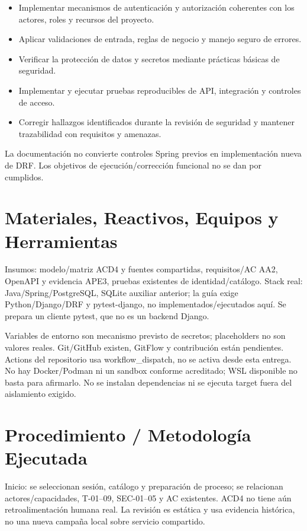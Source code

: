 \documentclass[11pt,a4paper]{article}
\providecommand{\tightlist}{\setlength{\itemsep}{0pt}\setlength{\parskip}{0pt}}
\begin{document}
\begin{itemize}
\tightlist
\item
  Implementar mecanismos de autenticación y autorización coherentes con
  los actores, roles y recursos del proyecto.
\item
  Aplicar validaciones de entrada, reglas de negocio y manejo seguro de
  errores.
\item
  Verificar la protección de datos y secretos mediante prácticas básicas
  de seguridad.
\item
  Implementar y ejecutar pruebas reproducibles de API, integración y
  controles de acceso.
\item
  Corregir hallazgos identificados durante la revisión de seguridad y
  mantener trazabilidad con requisitos y amenazas.
\end{itemize}

La documentación no convierte controles Spring previos en implementación
nueva de DRF. Los objetivos de ejecución/corrección funcional no se dan
por cumplidos.

\section{Materiales, Reactivos, Equipos y
Herramientas}\label{APE4-semana-4-materiales-reactivos-equipos-y-herramientas}

Insumos: modelo/matriz ACD4 y fuentes compartidas, requisitos/AC AA2,
OpenAPI y evidencia APE3, pruebas existentes de identidad/catálogo.
Stack real: Java/Spring/PostgreSQL, SQLite auxiliar anterior; la guía
exige Python/Django/DRF y pytest-django, no implementados/ejecutados
aquí. Se prepara un cliente pytest, que no es un backend Django.

Variables de entorno son mecanismo previsto de secretos; placeholders no
son valores reales. Git/GitHub existen, GitFlow y contribución están
pendientes. Actions del repositorio usa workflow\_dispatch, no se activa
desde esta entrega. No hay Docker/Podman ni un sandbox conforme
acreditado; WSL disponible no basta para afirmarlo. No se instalan
dependencias ni se ejecuta target fuera del aislamiento exigido.

\section{Procedimiento / Metodología
Ejecutada}\label{APE4-semana-4-procedimiento--metodologuxeda-ejecutada}

Inicio: se seleccionan sesión, catálogo y preparación de proceso; se
relacionan actores/capacidades, T-01--09, SEC-01--05 y AC existentes.
ACD4 no tiene aún retroalimentación humana real. La revisión es estática
y usa evidencia histórica, no una nueva campaña local sobre servicio
compartido.
\end{document}
